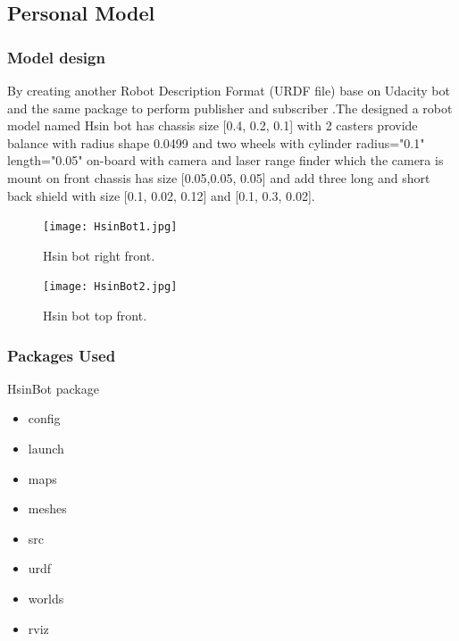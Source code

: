 \documentclass[10pt,journal,compsoc]{IEEEtran}
\begin{document}
\subsection{Personal Model}
\subsubsection{Model design}
By creating another Robot Description Format (URDF file) base on Udacity bot and the same package to perform publisher and subscriber .The designed a robot model named Hsin bot has chassis size [0.4, 0.2, 0.1] with 2 casters provide balance with radius shape 0.0499 and two wheels with cylinder radius="0.1" length="0.05" on-board with camera and laser range finder which the camera is mount on front chassis has size [0.05,0.05, 0.05] and add three long and short back shield with size [0.1, 0.02, 0.12] and [0.1, 0.3, 0.02]. 
\begin{figure}[thpb]
      \centering
      \texttt{[image: HsinBot1.jpg]}
      \caption{Hsin bot right front.}
      \label{fig:robot1}
\end{figure}
\begin{figure}[thpb]
      \centering
      \texttt{[image: HsinBot2.jpg]}
      \caption{Hsin bot top front.}
      \label{fig:robot1}
\end{figure}
\subsubsection{Packages Used}
HsinBot package
\begin{itemize}
\item config
\item launch
\item maps
\item meshes
\item src
\item urdf
\item worlds
\item rviz
\end {itemize}
\end{document}
